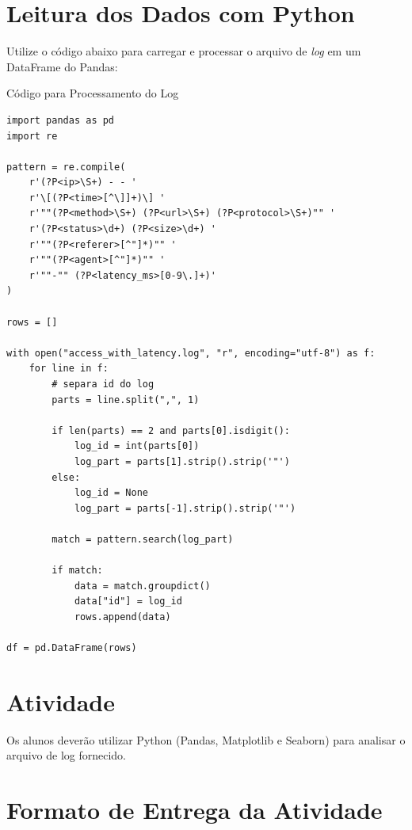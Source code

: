 \documentclass[12pt,a4paper]{report}
\begin{document}
\section*{Leitura dos Dados com Python}

Utilize o código abaixo para carregar e processar o arquivo de \textit{log} em um DataFrame do Pandas:

\begin{block}{Código para Processamento do Log}
\small
\begin{verbatim}
import pandas as pd
import re

pattern = re.compile(
    r'(?P<ip>\S+) - - '
    r'\[(?P<time>[^\]]+)\] '
    r'""(?P<method>\S+) (?P<url>\S+) (?P<protocol>\S+)"" '
    r'(?P<status>\d+) (?P<size>\d+) '
    r'""(?P<referer>[^"]*)"" '
    r'""(?P<agent>[^"]*)"" '
    r'""-"" (?P<latency_ms>[0-9\.]+)'
)

rows = []

with open("access_with_latency.log", "r", encoding="utf-8") as f:
    for line in f:
        # separa id do log
        parts = line.split(",", 1)

        if len(parts) == 2 and parts[0].isdigit():
            log_id = int(parts[0])
            log_part = parts[1].strip().strip('"')
        else:
            log_id = None
            log_part = parts[-1].strip().strip('"')

        match = pattern.search(log_part)

        if match:
            data = match.groupdict()
            data["id"] = log_id
            rows.append(data)

df = pd.DataFrame(rows)
\end{verbatim}
\end{block}

\section*{Atividade}

Os alunos deverão utilizar Python (Pandas, Matplotlib e Seaborn) para analisar o arquivo de log fornecido.
\section*{Formato de Entrega da Atividade}
\end{document}
